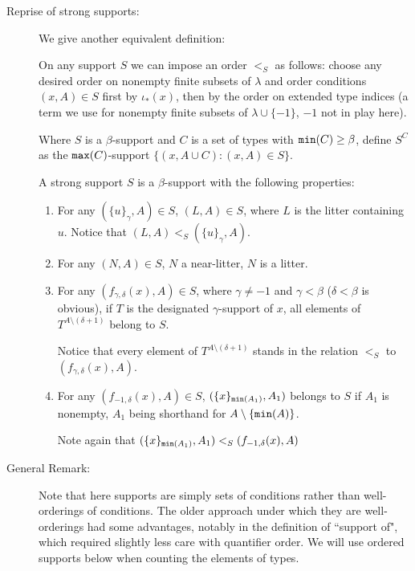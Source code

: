 \documentclass[112pt]{article}
\begin{document}
\begin{description}
\item[Reprise of strong supports:]  We give another equivalent definition:

On any support $S$ we can impose an order $<_S$ as follows:  choose any desired order on nonempty finite subsets of $\lambda$ and order conditions $(x,A)\in S$ first by $\iota_*(x)$, then by the order on extended type indices (a term we use for nonempty finite subsets of $\lambda \cup \{-1\}$, $-1$ not in play here).

Where $S$ is a $\beta$-support and $C$ is a set of types with ${\tt min}(C) \geq \beta$, define
$S^C$ as the ${\tt max}(C)$-support $\{(x,A \cup C):(x,A) \in S\}$.

A strong support $S$ is a $\beta$-support with the following properties:

\begin{enumerate}

\item  For any $(\{u\}_\gamma,A) \in S$, $(L,A) \in S$, where $L$ is the litter containing $u$.  Notice
that $(L,A) <_S (\{u\}_\gamma,A)$.

\item   For any $(N,A) \in S$, $N$ a near-litter, $N$ is a litter.

\item  For any $(f_{\gamma,\delta}(x),A) \in S$, where $\gamma \neq -1$ and $\gamma < \beta$ ($\delta<\beta$ is obvious),
if $T$ is the designated $\gamma$-support of $x$, all elements of $T^{A \setminus (\delta+1)}$ belong to $S$.

Notice that every element of $T^{A \setminus (\delta+1)}$ stands in the relation $<_S$ to $(f_{\gamma,\delta}(x),A)$.

\item For any $(f_{-1,\delta}(x),A) \in S$, $(\{x\}_{{\tt min}(A_1)},A_1)$ belongs to $S$
if $A_1$ is nonempty,  $A_1$ being shorthand for $A \setminus \{{\tt min}(A)\}$.

Note again that $(\{x\}_{{\tt min}(A_1)},A_1) <_S (f_{-1,\delta}(x),A)$

\end{enumerate}




\item[General Remark:]  Note that here supports are simply sets of conditions rather than well-orderings of conditions.  The older approach under which they are well-orderings had some advantages, notably in the definition of ``support of", which required slightly less care with quantifier order.  We will use ordered supports below when counting the elements of types.


\end{description}
\end{document}
